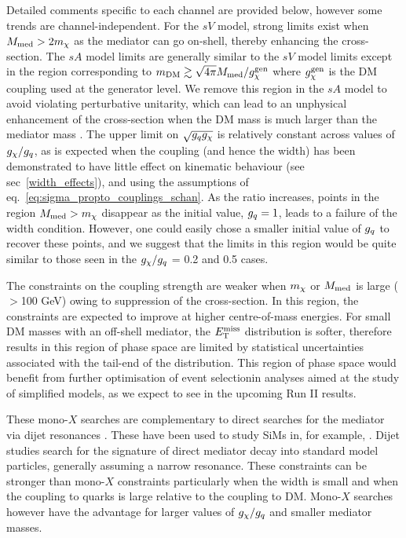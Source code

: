 Detailed comments specific to each channel are provided below, however some trends are channel-independent. For the $sV$ model, strong limits exist when $M_{\mathrm{med}} > 2 m_{\chi}$ as the mediator can go on-shell, thereby enhancing the cross-section. The $sA$ model limits are generally similar to the $sV$ model limits except in the region corresponding to $m_{\mathrm{DM}} \gtrsim \sqrt{4\pi} M_{\mathrm{med}} / g^{\rm gen}_\chi$ where $g^{\rm gen}_\chi$ is the DM coupling used at the generator level. We remove this region in the $sA$ model to avoid violating perturbative unitarity, which can lead to an unphysical enhancement of the cross-section when the DM mass is much larger than the mediator mass \cite{Chala:2015ama,Bell:2015rdw}. The upper limit on $\sqrt{g_q g_{\chi}}$ is relatively constant across values of $g_{\chi} / g_q$, as is expected when the coupling (and hence the width) has been demonstrated to have little effect on kinematic behaviour (see sec~\ref{width_effects}), and using the assumptions of eq.~\ref{eq:sigma_propto_couplings_schan}. As the ratio increases, points in the region $M_{\mathrm{med}} > m_{\chi}$ disappear as the initial value, $g_q = 1$, leads to a failure of the width condition. However, one could easily chose a smaller initial value of $g_q$ to recover these points, and we suggest that the limits in this region would be quite similar to those seen in the $g_{\chi} / g_q$ = 0.2 and 0.5 cases.

The constraints on the coupling strength are weaker when $m_{\chi}$ or $M_{\mathrm{med}}$ is large ($>$100 GeV) owing to suppression of the cross-section. In this region, the constraints are expected to improve at higher centre-of-mass energies. For small DM masses with an off-shell mediator, the $E_{\mathrm{T}}^{\mathrm{miss}}$ distribution is softer, therefore results in this region of phase space are limited by statistical uncertainties associated with the tail-end of the distribution. This region of phase space would benefit from further optimisation of event selectionin analyses aimed at the study of simplified models, as we expect to see in the upcoming Run II results.

These mono-$X$ searches are complementary to direct searches for the mediator via dijet resonances \cite{Chatrchyan:2013qha, Aad:2014aqa, Aaltonen:2008dn, Khachatryan:2015sja}. These have been used to study SiMs in, for example, \cite{An:2012va,Chala:2015ama, Zurek:tchannel}. Dijet studies search for the signature of direct mediator decay into standard model particles, generally assuming a narrow resonance. These constraints can be stronger than mono-$X$ constraints particularly when the width is small and when the coupling to quarks is large relative to the coupling to DM. Mono-$X$ searches however have the advantage for larger values of $g_{\chi}/g_q$ and smaller mediator masses.

